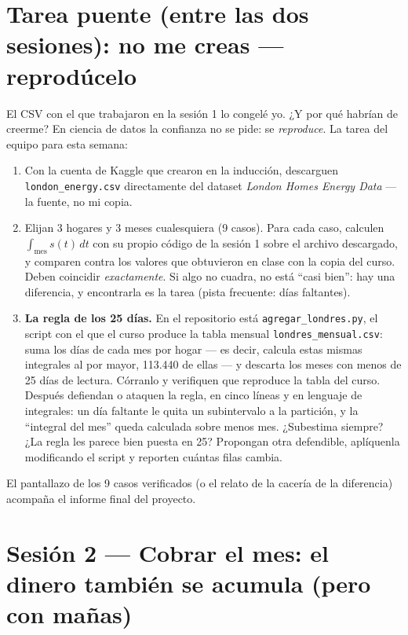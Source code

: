 \documentclass[12pt,letterpaper]{article}
\begin{document}
\section{Tarea puente (entre las dos sesiones): no me creas --- reprodúcelo}
El CSV con el que trabajaron en la sesión 1 lo congelé yo. ¿Y por qué habrían de creerme? En ciencia de datos la confianza no se pide: se \emph{reproduce}. La tarea del equipo para esta semana:
\begin{enumerate}[label=\arabic*., itemsep=0.15em]
    \item Con la cuenta de Kaggle que crearon en la inducción, descarguen \texttt{london\_energy.csv} directamente del dataset \emph{London Homes Energy Data} --- la fuente, no mi copia.
    \item Elijan 3 hogares y 3 meses cualesquiera (9 casos). Para cada caso, calculen $\int_{\text{mes}} s(t)\,dt$ con su propio código de la sesión 1 sobre el archivo descargado, y comparen contra los valores que obtuvieron en clase con la copia del curso. Deben coincidir \emph{exactamente}. Si algo no cuadra, no está ``casi bien'': hay una diferencia, y encontrarla es la tarea (pista frecuente: días faltantes).
    \item \textbf{La regla de los 25 días.} En el repositorio está \texttt{agregar\_londres.py}, el script con el que el curso produce la tabla mensual \texttt{londres\_mensual.csv}: suma los días de cada mes por hogar --- es decir, calcula estas mismas integrales al por mayor, 113.440 de ellas --- y descarta los meses con menos de 25 días de lectura. Córranlo y verifiquen que reproduce la tabla del curso. Después defiendan o ataquen la regla, en cinco líneas y en lenguaje de integrales: un día faltante le quita un subintervalo a la partición, y la ``integral del mes'' queda calculada sobre menos mes. ¿Subestima siempre? ¿La regla les parece bien puesta en 25? Propongan otra defendible, aplíquenla modificando el script y reporten cuántas filas cambia.
\end{enumerate}
El pantallazo de los 9 casos verificados (o el relato de la cacería de la diferencia) acompaña el informe final del proyecto.

\section{Sesión 2 --- Cobrar el mes: el dinero también se acumula (pero con mañas)}
\end{document}
